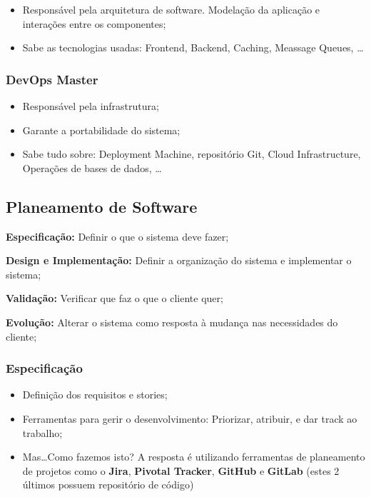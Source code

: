 \documentclass{article}
\begin{document}
\begin{itemize}
  \item Responsável pela arquitetura de software. Modelação da aplicação
  e interações entre os componentes;
  \item Sabe as tecnologias usadas: Frontend, Backend, Caching, Meassage Queues, \dots
\end{itemize}

\subsubsection{DevOps Master}

\begin{itemize}
  \item Responsável pela infrastrutura;
  \item Garante a portabilidade do sistema;
  \item Sabe tudo sobre: Deployment Machine, repositório Git,
  Cloud Infrastructure, Operações de bases de dados, \dots
\end{itemize}

\subsection{Planeamento de Software}

\begin{flushleft}
  \textbf{Especificação:} Definir o que o sistema deve fazer;

  \vspace{2mm}

  \textbf{Design e Implementação:} Definir a organização do sistema
  e implementar o sistema;
  
  \vspace{2mm}

  \textbf{Validação:} Verificar que faz o que o cliente quer;

  \vspace{2mm}

  \textbf{Evolução:} Alterar o sistema como resposta à mudança
  nas necessidades do cliente;
\end{flushleft}

\subsubsection{Especificação}

\begin{itemize}
  \item Definição dos requisitos e stories;
  \item Ferramentas para gerir o desenvolvimento: Priorizar, atribuir,
  e dar track ao trabalho;
  \item Mas\dots Como fazemos isto? A resposta é utilizando ferramentas
  de planeamento de projetos como o \textbf{Jira}, \textbf{Pivotal Tracker},
  \textbf{GitHub} e \textbf{GitLab} (estes 2 últimos possuem repositório de código) 
\end{itemize}
\end{document}
